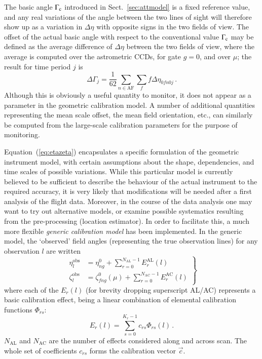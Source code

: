 \documentclass[structabstract]{aa}
\begin{document}
The basic angle $\Gamma_{\rm c}$ introduced in Sect.~\ref{sec:attmodel} is
a fixed reference value, and any real variations of the angle between
the two lines of sight will therefore show up as a variation in
$\Delta\eta$ with opposite signs in the two fields of view.
The offset of the actual basic angle with respect to the conventional
value $\Gamma_{\rm c}$ may be defined as the average difference of 
$\Delta\eta$
between the two fields of view, where the average is computed over the
astrometric CCDs, for gate $g=0$, and over $\mu$; the result for
time period $j$ is
\begin{equation}\label{eq:DeltaGamma}
\Delta\Gamma_j = \frac{1}{62}\sum_{n\in\text{AF}}\sum_f
f\Delta\eta_{0fn0j} \, .
\end{equation}
Although this is obviously a useful quantity to monitor, it does not
appear as a parameter in the geometric calibration model. A number of
additional quantities representing the mean scale offset, the mean
field orientation, etc., can similarly be computed from the large-scale
calibration parameters for the purpose of monitoring.

Equation~(\ref{eq:etazeta}) encapsulates a specific formulation of the
geometric instrument model, with certain assumptions about the shape,
dependencies, and time scales of possible variations. While this particular
model is currently believed to be sufficient to describe the behaviour of
the actual instrument to the required accuracy, it is very likely that
modifications will be needed after a first analysis of the flight data.
Moreover, in the course of the data analysis one may want to try out
alternative models, or examine possible systematics resulting from the
pre-processing (location estimator). In order to facilitate this, a
much more flexible \emph{generic calibration model} has been
implemented. In the generic model, the `observed' field angles
(representing the true observation lines) for any observation $l$ are
written
\begin{equation}\label{eq:generic1}
\left.
\begin{aligned}
\eta_l^\text{obs} &= \eta^0_{ng}
+ \sum_{r=0}^{N_\text{AL}-1} E_r^\text{AL}(l) \\
\zeta_l^\text{obs} &= \zeta^0_{fng}(\mu)
+ \sum_{r=0}^{N_\text{AC}-1} E_r^\text{AC}(l)
\end{aligned}
\right\}
\end{equation}
where each of the $E_r(l)$ (for brevity dropping superscript AL/AC)
represents a basic calibration effect, being a linear combination of
elemental calibration functions $\Phi_{rs}$:
\begin{equation}\label{eq:generic2}
E_r(l) = \sum_{s=0}^{K_r-1} c_{rs}\Phi_{rs}(l) \, .
\end{equation}
$N_\text{AL}$ and $N_\text{AC}$ are the number of effects considered
along and across scan.
The whole set of coefficients $c_{rs}$ forms the calibration vector $\vec{c}$.
\end{document}
